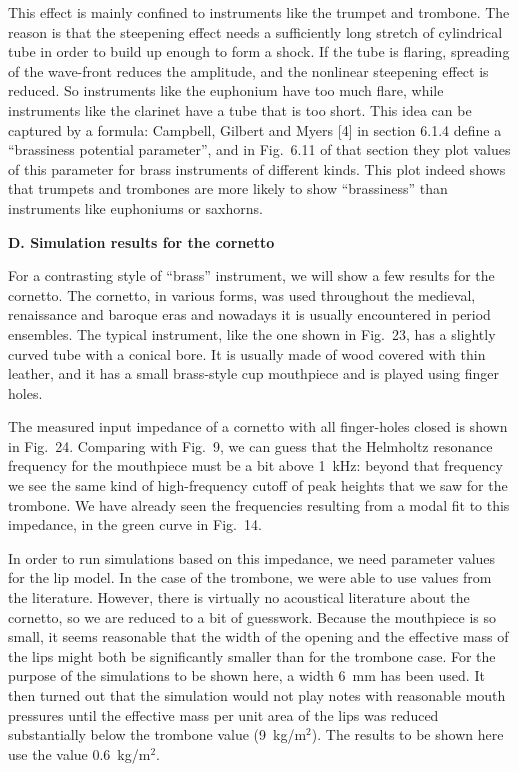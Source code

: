   This effect is mainly confined to instruments like the trumpet and trombone. 
  The reason is that the steepening effect needs a sufficiently long stretch of 
  cylindrical tube in order to build up enough to form a shock. If the tube is 
  flaring, spreading of the wave-front reduces the amplitude, and the nonlinear 
  steepening effect is reduced. So instruments like the euphonium have too much 
  flare, while instruments like the clarinet have a tube that is too short. 
  This idea can be captured by a formula: Campbell, Gilbert and Myers [4] in 
  section 6.1.4 define a “brassiness potential parameter”, and in Fig.\ 6.11 of 
  that section they plot values of this parameter for brass instruments of 
  different kinds. This plot indeed shows that trumpets and trombones are more 
  likely to show “brassiness” than instruments like euphoniums or saxhorns. 

  \textbf{D. Simulation results for the cornetto} 

  For a contrasting style of “brass” instrument, we will show a few results for 
  the cornetto. The cornetto, in various forms, was used throughout the 
  medieval, renaissance and baroque eras and nowadays it is usually encountered 
  in period ensembles. The typical instrument, like the one shown in Fig.\ 23, 
  has a slightly curved tube with a conical bore. It is usually made of wood 
  covered with thin leather, and it has a small brass-style cup mouthpiece and 
  is played using finger holes. 


  The measured input impedance of a cornetto with all finger-holes closed is 
  shown in Fig.\ 24. Comparing with Fig.\ 9, we can guess that the Helmholtz 
  resonance frequency for the mouthpiece must be a bit above 1~kHz: beyond that 
  frequency we see the same kind of high-frequency cutoff of peak heights that 
  we saw for the trombone. We have already seen the frequencies resulting from 
  a modal fit to this impedance, in the green curve in Fig.\ 14. 


  In order to run simulations based on this impedance, we need parameter values 
  for the lip model. In the case of the trombone, we were able to use values 
  from the literature. However, there is virtually no acoustical literature 
  about the cornetto, so we are reduced to a bit of guesswork. Because the 
  mouthpiece is so small, it seems reasonable that the width of the opening and 
  the effective mass of the lips might both be significantly smaller than for 
  the trombone case. For the purpose of the simulations to be shown here, a 
  width 6~mm has been used. It then turned out that the simulation would not 
  play notes with reasonable mouth pressures until the effective mass per unit 
  area of the lips was reduced substantially below the trombone value 
  (9~kg/m$^2$). The results to be shown here use the value 0.6~kg/m$^2$. 

